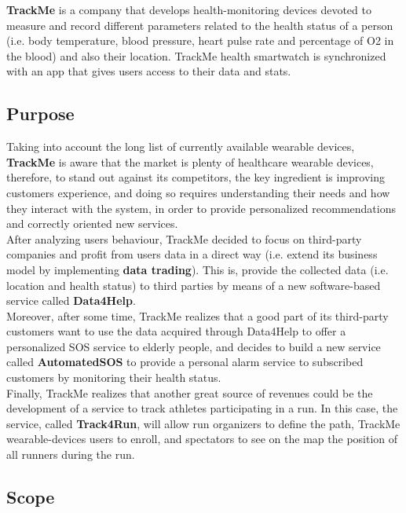\documentclass[12pt]{article}
\begin{document}
\textbf{TrackMe} is a company that develops health-monitoring devices devoted to measure and record different parameters related to the health status of a person (i.e. body temperature, blood pressure, heart pulse rate and percentage of O2 in the blood) and also their location. TrackMe health smartwatch is synchronized with an app that gives users access to their data and stats.  

\subsection{Purpose}
Taking into account the long list of currently available wearable devices, \textbf{TrackMe}  is aware that the market is plenty of healthcare wearable devices, therefore, to stand out against its competitors, the key ingredient is improving customers experience, and doing so requires understanding their needs and how they interact with the system, in order to provide personalized recommendations and correctly oriented new services. \\

After analyzing users behaviour, TrackMe decided to focus on third-party companies and profit from users data in a direct way (i.e. extend its business model by implementing \textbf{data trading}). This is, provide the collected data (i.e. location and health status) to third parties by means of a new software-based service called \textbf{Data4Help}. \\

Moreover, after some time, TrackMe realizes that a good part of its third-party customers want to use the data acquired through Data4Help to offer a personalized SOS service to elderly people, and decides to build a new service called \textbf{AutomatedSOS} to provide a personal alarm service to subscribed customers by monitoring their health status. \\

Finally, TrackMe realizes that another great source of revenues could be the development of a service to track athletes participating in a run. In this case, the service, called \textbf{Track4Run}, will allow run organizers to define the path, TrackMe wearable-devices users to enroll, and spectators to see on the map the position of all runners during the run. \\

\subsection{Scope}
\end{document}
